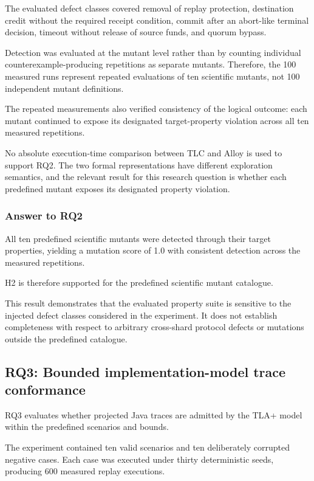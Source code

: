 The evaluated defect classes covered removal of replay protection,
destination credit without the required receipt condition, commit after
an abort-like terminal decision, timeout without release of source
funds, and quorum bypass.

Detection was evaluated at the mutant level rather than by counting
individual counterexample-producing repetitions as separate mutants.
Therefore, the 100 measured runs represent repeated evaluations of ten
scientific mutants, not 100 independent mutant definitions.

The repeated measurements also verified consistency of the logical
outcome: each mutant continued to expose its designated target-property
violation across all ten measured repetitions.

No absolute execution-time comparison between TLC and Alloy is used to
support RQ2. The two formal representations have different exploration
semantics, and the relevant result for this research question is
whether each predefined mutant exposes its designated property
violation.

\subsubsection{Answer to RQ2}
\label{subsubsec:rq2-answer}

All ten predefined scientific mutants were detected through their
target properties, yielding a mutation score of 1.0 with consistent
detection across the measured repetitions.

H2 is therefore supported for the predefined scientific mutant
catalogue.

This result demonstrates that the evaluated property suite is
sensitive to the injected defect classes considered in the experiment.
It does not establish completeness with respect to arbitrary
cross-shard protocol defects or mutations outside the predefined
catalogue.

\subsection{RQ3: Bounded implementation-model trace conformance}
\label{subsec:rq3-results}

RQ3 evaluates whether projected Java traces are admitted by the TLA+
model within the predefined scenarios and bounds.

The experiment contained ten valid scenarios and ten deliberately
corrupted negative cases. Each case was executed under thirty
deterministic seeds, producing 600 measured replay executions.

